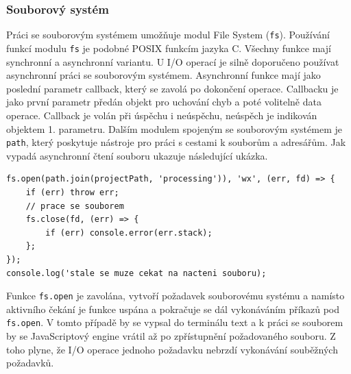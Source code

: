 \subsubsection{Souborový systém}
Práci se souborovým systémem umožňuje modul File System (\texttt{fs}). Používání funkcí modulu \texttt{fs} je podobné POSIX funkcím jazyka C. Všechny funkce mají synchronní a asynchronní variantu. U I/O operací je silně doporučeno používat asynchronní práci se souborovým systémem. Asynchronní funkce mají jako poslední parametr callback, který se zavolá po dokončení operace. Callbacku je jako první parametr předán objekt pro uchování chyb a poté volitelně data operace. Callback je volán při úspěchu i neúspěchu, neúspěch je indikován objektem 1. parametru. Dalším modulem spojeným se souborovým systémem je \texttt{path}, který poskytuje nástroje pro práci s cestami k souborům a adresářům. Jak vypadá asynchronní čtení souboru ukazuje následující ukázka.
\begin{lstlisting}[style=JavaScript]
fs.open(path.join(projectPath, 'processing')), 'wx', (err, fd) => {
    if (err) throw err;
    // prace se souborem
    fs.close(fd, (err) => {
        if (err) console.error(err.stack);
    };
});
console.log('stale se muze cekat na nacteni souboru);
\end{lstlisting}

Funkce \texttt{fs.open} je zavolána, vytvoří požadavek souborovému systému a namísto aktivního čekání je funkce uspána a pokračuje se dál vykonáváním příkazů pod \texttt{fs.open}. V tomto případě by se vypsal do terminálu text  a k práci se souborem by se JavaScriptový engine vrátil až po zpřístupnění požadovaného souboru. Z toho plyne, že I/O operace jednoho požadavku nebrzdí vykonávání souběžných požadavků.

